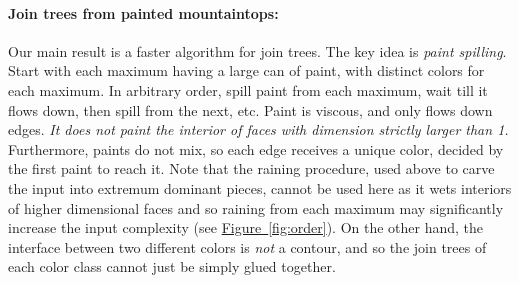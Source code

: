 \documentclass[11pt]{article}
\newcommand{\myparagraph}[1]{\paragraph{#1}}
\newtheorem{definition}[theorem]{Definition}
\theoremstyle{definition}
\newcommand{\NN}{\mathbb{N}}
\newcommand{\Fig}[1]{\hyperref[fig:#1]{Figure~\ref*{fig:#1}}} %
\newcommand{\Def}[1]{\hyperref[def:#1]{Definition~\ref*{def:#1}}} %
\begin{document}
\myparagraph{Join trees from painted mountaintops:} Our main result is a faster algorithm for join trees.
The key idea is \emph{paint spilling}. Start with each maximum having a large can of paint, with distinct
colors for each maximum. In arbitrary order, spill paint from each maximum, wait till it flows down,
then spill from the next, etc. Paint is viscous, and only flows down edges. \emph{It does not
paint the interior of faces with dimension strictly larger than 1.} 
Furthermore, paints do not mix, so each edge receives a unique color, decided by the first paint to reach it.  
%
Note that the raining procedure, used above to carve the input into extremum dominant pieces, 
cannot be used here as it wets interiors of higher dimensional faces and so raining from each maximum may significantly increase the input complexity (see \Fig{order}).
On the other hand, the interface between two different colors is \emph{not} a contour, and so the join trees of each color class cannot just be simply glued together.

% 

\end{document}
